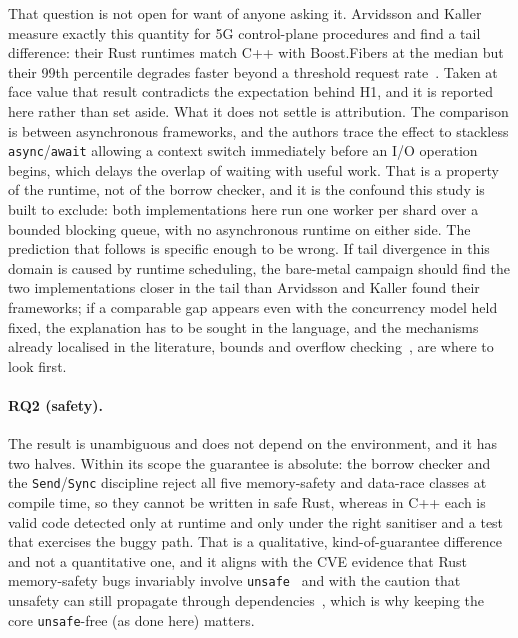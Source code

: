 \documentclass[english,twoside,openright,a4paper,censored,csm,software-track-2020]{HYthesisML}
\begin{document}
That question is not open for want of anyone asking it. Arvidsson and Kaller measure exactly
this quantity for 5G control-plane procedures and find a tail difference: their Rust runtimes
match C++ with Boost.Fibers at the median but their 99th percentile degrades faster beyond a
threshold request rate~\cite{arvidsson2025async}. Taken at face value that result contradicts
the expectation behind H1, and it is reported here rather than set aside. What it does not
settle is attribution. The comparison is between asynchronous frameworks, and the authors trace
the effect to stackless \texttt{async}/\texttt{await} allowing a context switch immediately
before an I/O operation begins, which delays the overlap of waiting with useful work. That is a
property of the runtime, not of the borrow checker, and it is the confound this study is built
to exclude: both implementations here run one worker per shard over a bounded blocking queue,
with no asynchronous runtime on either side. The prediction that follows is specific enough to
be wrong. If tail divergence in this domain is caused by runtime scheduling, the bare-metal
campaign should find the two implementations closer in the tail than Arvidsson and Kaller found
their frameworks; if a comparable gap appears even with the concurrency model held fixed, the
explanation has to be sought in the language, and the mechanisms already localised in the
literature, bounds and overflow checking~\cite{zhang2022runtime,harris2023morello}, are where
to look first.

\paragraph{RQ2 (safety).} The result is unambiguous and does not depend on the environment,
and it has two halves. Within its scope the guarantee is absolute: the borrow checker and the
\texttt{Send}/\texttt{Sync} discipline reject all five memory-safety and data-race classes at
compile time, so they cannot be written in safe Rust, whereas in C++ each is valid code
detected only at runtime and only under the right sanitiser and a test that exercises the
buggy path. That is a qualitative, kind-of-guarantee difference and not a quantitative
one, and it aligns with the CVE evidence that Rust memory-safety bugs invariably involve
\texttt{unsafe}~\cite{xu2021rustcve} and with the caution that unsafety can still propagate
through dependencies~\cite{evans2020rust}, which is why keeping the core \texttt{unsafe}-free
(as done here) matters.
\end{document}
